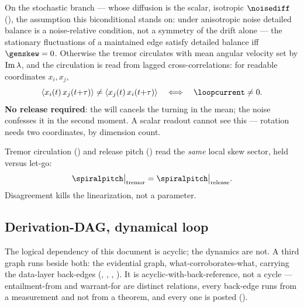 \documentclass[../main]{subfiles}
\begin{document}
\begin{theorem}
%
  On the stochastic branch --- whose diffusion is the scalar, isotropic $\noisediff$
  (), the assumption this biconditional stands on: under anisotropic
  noise detailed balance is a noise-relative condition, not a symmetry of the drift
  alone --- the stationary fluctuations of a maintained edge satisfy
  detailed balance iff $\genskew=0$. Otherwise the tremor circulates with mean angular
  velocity set by $\operatorname{Im}\eigval$, and the circulation is read from lagged
  cross-correlations: for readable coordinates $x_i,x_j$,
  \begin{equation}
    \langle x_i(t)\,x_j(t{+}\tau)\rangle
      \neq\langle x_j(t)\,x_i(t{+}\tau)\rangle
    \quad\Longleftrightarrow\quad \loopcurrent\neq0.
    \label{eq:dyn:loop}
  \end{equation}
  \textbf{No release required}: the will cancels the turning in the mean; the noise
  confesses it in the second moment. A scalar readout cannot see
  this --- rotation needs two coordinates, by dimension count.
\end{theorem}

\begin{theorem}
  Tremor circulation () and release pitch () read the
  \emph{same} local skew sector, held versus let-go:
  \begin{equation}
    \spiralpitch\big|_{\mathrm{tremor}}=\spiralpitch\big|_{\mathrm{release}}.
    \label{eq:dyn:pitchpair}
  \end{equation}
  Disagreement kills the linearization, not a parameter.
\end{theorem}

\subsection{Derivation-DAG, dynamical loop}
\label{subsec:osc:dag}
%
The logical dependency of this document is acyclic; the dynamics are not. A third graph runs
beside both: the evidential graph, what-corroborates-what, carrying the data-layer
back-edges (, , ,
). It is
acyclic-with-back-reference, not a cycle ---
entailment-from and warrant-for are distinct relations, every back-edge runs from a
measurement and not from a theorem, and every one is posted
().
\end{document}
